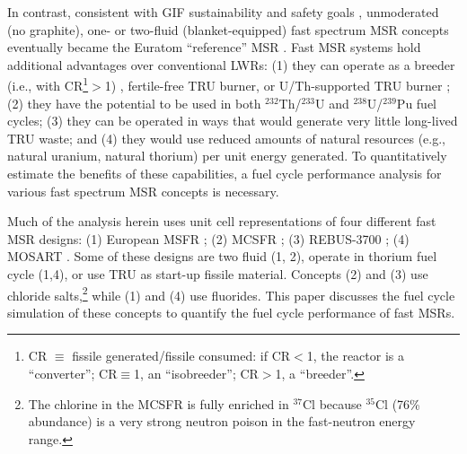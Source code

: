 \documentclass[letterpaper]{mandc2019}
\begin{document}
In contrast, consistent with \gls{GIF} sustainability and safety goals \cite{gif_generation_2015}, unmoderated (no graphite), one- or two-fluid (blanket-equipped) fast spectrum \gls{MSR} concepts eventually became the Euratom ``reference'' \gls{MSR} \cite{euratom_final_2015}. Fast \gls{MSR} systems hold additional advantages over conventional \glspl{LWR}:
(1) they can operate as a breeder (i.e., with \gls{CR}\footnote{\gls{CR} $\equiv$ fissile generated/fissile consumed: if CR$<$1, the reactor is a ``converter''; CR$\equiv$1, an ``isobreeder''; CR$>$1, a ``breeder''.}$>$1) \cite{euratom_final_2015, simmons_assessment_1974, mourogov_potentialities_2006-1}, fertile-free \gls{TRU} burner, or U/Th-supported \gls{TRU} burner \cite{ignatiev_progress_2007};
(2) they have the potential to be used in both $^{232}$Th/$^{233}$U and $^{238}$U/$^{239}$Pu fuel cycles;
(3) they can be operated in ways that would generate very little long-lived \gls{TRU} waste; and
(4) they would use reduced amounts of natural resources (e.g., natural uranium, natural thorium) per unit energy generated. To quantitatively estimate the benefits of these capabilities, a fuel cycle performance analysis for various fast spectrum \gls{MSR} concepts is necessary.

Much of the analysis herein uses unit cell representations of four different fast \gls{MSR} designs:
(1) European \gls{MSFR} \cite{euratom_final_2015};
(2) \gls{MCSFR} \cite{simmons_assessment_1974};
(3) REBUS-3700 \cite{mourogov_potentialities_2006-1};
(4) \gls{MOSART} \cite{ignatiev_progress_2007}.
Some of these designs are two fluid (1, 2), operate in thorium fuel cycle (1,4), or use \gls{TRU} as start-up fissile material. Concepts (2) and (3) use chloride salts,\footnote{The chlorine in the \gls{MCSFR} is fully enriched in $^{37}$Cl because $^{35}$Cl (76\% abundance) is a very strong neutron poison in the fast-neutron energy range.} while (1) and (4) use fluorides. This paper discusses the fuel cycle simulation of these concepts to quantify the fuel cycle performance of fast \glspl{MSR}.
\end{document}
